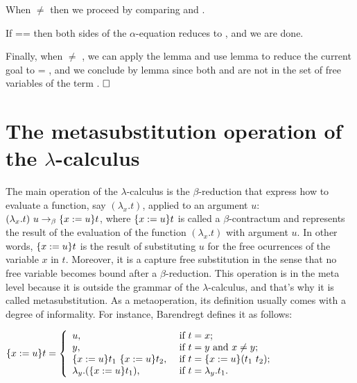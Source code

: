 When  \ensuremath{\not=}  then we proceed by comparing  and .
\begin{coqdoccode}
\end{coqdoccode}
If  ==  then both sides of the $\alpha$-equation reduces to    , and we are done. 
\begin{coqdoccode}
\end{coqdoccode}
Finally, when  \ensuremath{\not=} , we can apply the lemma  and use lemma  to reduce the current goal to     = , and we conclude by lemma  since both  and  are not in the set of free variables of the term . $\hfill\Box$
\begin{coqdoccode}
\coqdocemptyline
\end{coqdoccode}
\section{The metasubstitution operation of the $\lambda$-calculus}



 The main operation of the $\lambda$-calculus is the $\beta$-reduction that express how to evaluate a function, say $(\lambda_x.t)$, applied to an argument $u$: $(\lambda_x.t)\ u \to_{\beta} \metasub{t}{x}{u}$, where $\metasub{t}{x}{u}$ is called a $\beta$-contractum and represents the result of the evaluation of the function $(\lambda_x.t)$ with argument $u$. In other words, $\metasub{t}{x}{u}$ is the result of substituting $u$ for the free ocurrences of the variable $x$ in $t$. Moreover, it is a capture free substitution in the sense that no free variable becomes bound after a $\beta$-reduction. This operation is in the meta level because it is outside the grammar of the $\lambda$-calculus, and that's why it is called metasubstitution. As a metaoperation, its definition usually comes with a degree of informality. For instance, Barendregt\cite{barendregtLambdaCalculusIts1984} defines it as follows:


\vspace{.5cm}
$\metasub{t}{x}{u} = \left\{
 \begin{array}{ll}
  u, & \mbox{ if } t = x; \\
  y, & \mbox{ if } t = y \mbox{ and } x \neq y; \\
  \metasub{t_1}{x}{u}\ \metasub{t_2}{x}{u}, & \mbox{ if } t = \metasub{(t_1\ t_2)}{x}{u}; \\
  \lambda_y.(\metasub{t_1}{x}{u}), & \mbox{ if } t = \lambda_y.t_1.
 \end{array}\right.$ \vspace{.5cm}


